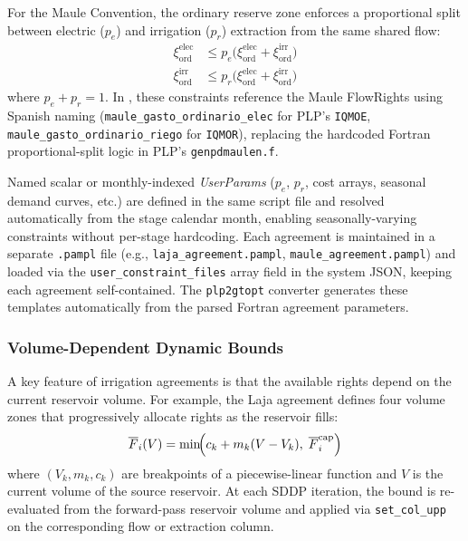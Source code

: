 For the Maule Convention, the ordinary reserve zone enforces a
proportional split between electric ($p_e$) and irrigation ($p_r$)
extraction from the same shared flow:
\begin{align}
\label{eq:uc_maule_pct}
\xi^\text{elec}_\text{ord} &\leq
  p_e \bigl(\xi^\text{elec}_\text{ord} + \xi^\text{irr}_\text{ord}\bigr) \\
\xi^\text{irr}_\text{ord}  &\leq
  p_r \bigl(\xi^\text{elec}_\text{ord} + \xi^\text{irr}_\text{ord}\bigr)
\end{align}
where $p_e + p_r = 1$.  In \gtopt{}, these constraints reference the
Maule FlowRights using Spanish naming
(\texttt{maule\_gasto\_ordinario\_elec} for PLP's \texttt{IQMOE},
\texttt{maule\_gasto\_ordinario\_riego} for \texttt{IQMOR}),
replacing the hardcoded Fortran proportional-split logic in PLP's
\texttt{genpdmaulen.f}.

Named scalar or monthly-indexed \emph{UserParams} ($p_e$, $p_r$, cost
arrays, seasonal demand curves, etc.) are defined in the same script
file and resolved automatically from the stage calendar month, enabling
seasonally-varying constraints without per-stage hardcoding.
Each agreement is maintained in a separate \texttt{.pampl} file
(e.g., \texttt{laja\_agreement.pampl}, \texttt{maule\_agreement.pampl})
and loaded via the \texttt{user\_constraint\_files} array field in the
system JSON, keeping each agreement self-contained.
The \texttt{plp2gtopt} converter generates these templates automatically
from the parsed Fortran agreement parameters.

\subsubsection{Volume-Dependent Dynamic Bounds}

A key feature of irrigation agreements is that the available rights
depend on the current reservoir volume.  For example, the Laja agreement
defines four volume zones that progressively allocate rights as the
reservoir fills:
\begin{equation}
\label{eq:bound_rule}
\overline{F}_i(V) = \min\!\Bigl(
  c_k + m_k (V - V_k),\; \overline{F}_i^\text{cap}
\Bigr)
\end{equation}
where $(V_k, m_k, c_k)$ are breakpoints of a piecewise-linear function
and $V$ is the current volume of the source reservoir.  At each SDDP
iteration, the bound is re-evaluated from the forward-pass reservoir
volume and applied via \texttt{set\_col\_upp} on the corresponding flow
or extraction column.

